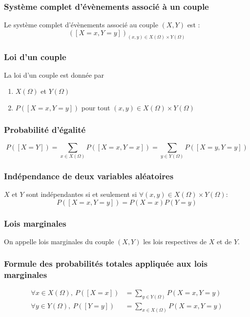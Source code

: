         \subsubsection{Système complet d'évènements associé à un couple}
            Le système complet d'évènements associé au couple $(X, Y)$ est : 
            \[
                ([X = x, Y = y])_{(x, y) \in X(\Omega) \times Y(\Omega) }
            \]  

        \subsubsection{Loi d'un couple}
            La loi d'un couple est donnée par 
            \begin{enumerate}
                \item $X(\Omega)$ et $Y(\Omega)$
                \item $P([X = x, Y = y])$ pour tout $(x, y) \in X(\Omega) \times Y(\Omega)$
            \end{enumerate}

        \subsubsection{Probabilité d'égalité}
            \begin{equation*}
                P([X = Y]) = \sum_{x \in X(\Omega)} P([X=x, Y=x]) = \sum_{y \in Y(\Omega)} P([X=y, Y=y])
            \end{equation*}

        \subsubsection{Indépendance de deux variables aléatoires}
            $X$ et $Y$ sont indépendantes si et seulement si $\forall (x, y) \in X(\Omega) \times Y(\Omega)$:
            \begin{equation*}
                P([X = x, Y = y]) = P(X = x)P(Y = y)
            \end{equation*}

        \subsubsection{Lois marginales}
            On appelle lois marginales du couple $(X, Y)$ les lois respectives de $X$ et de $Y$.

        \subsubsection{Formule des probabilités totales appliquée aux lois marginales}
            \begin{align*}
                \forall x \in X(\Omega),\ P([X = x]) &= \sum_{y \in Y(\Omega)} P(X = x, Y = y)\\
                \forall y \in Y(\Omega),\ P([Y = y]) &= \sum_{x \in X(\Omega)} P(X = x, Y = y)
            \end{align*}

